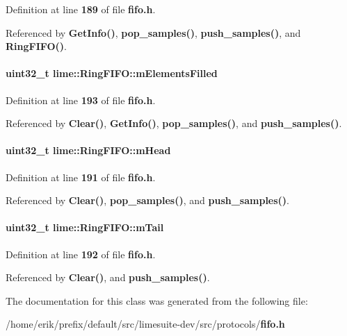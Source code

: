Definition at line {\bf 189} of file {\bf fifo.\+h}.



Referenced by {\bf Get\+Info()}, {\bf pop\+\_\+samples()}, {\bf push\+\_\+samples()}, and {\bf Ring\+F\+I\+F\+O()}.

\paragraph[{m\+Elements\+Filled}]{\setlength{\rightskip}{0pt plus 5cm}uint32\+\_\+t lime\+::\+Ring\+F\+I\+F\+O\+::m\+Elements\+Filled\hspace{0.3cm}{\ttfamily [protected]}}\label{classlime_1_1RingFIFO_a48d0a36f75ecde0cd9b1dc6e47042d20}


Definition at line {\bf 193} of file {\bf fifo.\+h}.



Referenced by {\bf Clear()}, {\bf Get\+Info()}, {\bf pop\+\_\+samples()}, and {\bf push\+\_\+samples()}.

\paragraph[{m\+Head}]{\setlength{\rightskip}{0pt plus 5cm}uint32\+\_\+t lime\+::\+Ring\+F\+I\+F\+O\+::m\+Head\hspace{0.3cm}{\ttfamily [protected]}}\label{classlime_1_1RingFIFO_afe97521130b0ad257f4cf2dea3f1a699}


Definition at line {\bf 191} of file {\bf fifo.\+h}.



Referenced by {\bf Clear()}, {\bf pop\+\_\+samples()}, and {\bf push\+\_\+samples()}.

\paragraph[{m\+Tail}]{\setlength{\rightskip}{0pt plus 5cm}uint32\+\_\+t lime\+::\+Ring\+F\+I\+F\+O\+::m\+Tail\hspace{0.3cm}{\ttfamily [protected]}}\label{classlime_1_1RingFIFO_a6b05435dbd1b5b466eea5859a3e7166c}


Definition at line {\bf 192} of file {\bf fifo.\+h}.



Referenced by {\bf Clear()}, and {\bf push\+\_\+samples()}.



The documentation for this class was generated from the following file\+:\begin{DoxyCompactItemize}
\item 
/home/erik/prefix/default/src/limesuite-\/dev/src/protocols/{\bf fifo.\+h}\end{DoxyCompactItemize}
